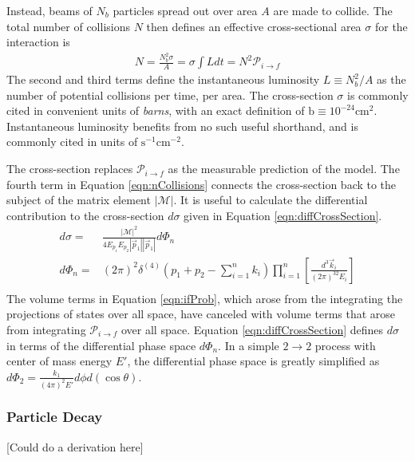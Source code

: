 Instead, beams of $N_b$ particles spread out over area $A$ are made to collide.
The total number of collisions $N$ then defines an effective cross-sectional area $\sigma$ for the interaction is
\begin{equation}\begin{split}\label{eqn:nCollisions}
    N=\frac{N_b^2\sigma}{A}=\sigma\int Ldt=N^2\mathcal{P}_{i\to f}
\end{split}\end{equation}
The second and third terms define the instantaneous luminosity $L\equiv N_b^2/A$ as the number of potential collisions per time, per area.
The cross-section $\sigma$ is commonly cited in convenient units of \emph{barns}, with an exact definition of $\text{b}\equiv10^{-24}\text{cm}^2$.
Instantaneous luminosity benefits from no such useful shorthand, and is commonly cited in units of $\text{s}^{-1}\text{cm}^{-2}$.

The cross-section replaces $\mathcal{P}_{i\to f}$ as the measurable prediction of the model.
The fourth term in Equation \ref{eqn:nCollisions} connects the cross-section back to the subject of the matrix element $|\mathcal{M}|$.
It is useful to calculate the differential contribution to the cross-section $d\sigma$ given in Equation \ref{eqn:diffCrossSection}.
\begin{equation}\begin{split}\label{eqn:diffCrossSection}
d\sigma=&\frac{|\mathcal{M}|^2}{4E_{p_1}E_{p_2}|\vec{p}_1||\vec{p}_1|}d\Phi_n \\
d\Phi_n=&(2\pi)^2\delta^{(4)}\left(p_1+p_2-\sum^n_{i=1}k_i\right)\prod^n_{i=1}\left[\frac{d^3\vec{k}_i}{(2\pi)^32E_i}\right] \\
\end{split}\end{equation}
The volume terms in Equation \ref{eqn:ifProb}, which arose from the integrating the projections of states over all space, have canceled with volume terms that arose from integrating $\mathcal{P}_{i\to f}$ over all space.
Equation \ref{eqn:diffCrossSection} defines $d\sigma$ in terms of the differential phase space $d\Phi_n$.
In a simple $2\to2$ process with center of mass energy $E'$, the differential phase space is greatly simplified as $d\Phi_2=\frac{k_1}{(4\pi)^2E'}d\phi d(\cos\theta)$.

\subsubsection{Particle Decay}
{\color{red} [Could do a derivation here]}

